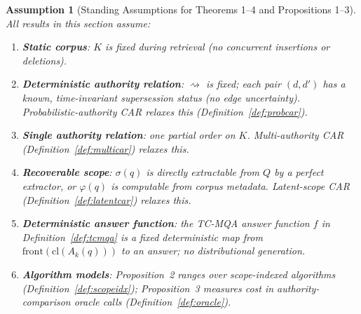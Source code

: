 \documentclass[11pt]{article}
\newtheorem{assumption}{Assumption}
\begin{document}
\begin{table}[h]
\centering\small
{}
\end{table}

\begin{assumption}[Standing Assumptions for Theorems 1--4 and Propositions 1--3]
\label{ass:standing}
All results in this section assume:
\begin{enumerate}[noitemsep,label=(\roman*)]
  \item \textbf{Static corpus}: $K$ is fixed during retrieval (no concurrent insertions or deletions).
  \item \textbf{Deterministic authority relation}: $\rightsquigarrow$ is fixed; each pair $(d,d')$ has a known, time-invariant supersession status (no edge uncertainty). Probabilistic-authority CAR relaxes this (Definition~\ref{def:probcar}).
  \item \textbf{Single authority relation}: one partial order on $K$. Multi-authority CAR (Definition~\ref{def:multicar}) relaxes this.
  \item \textbf{Recoverable scope}: $\sigma(q)$ is directly extractable from $Q$ by a perfect extractor, or $\varphi(q)$ is computable from corpus metadata. Latent-scope CAR (Definition~\ref{def:latentcar}) relaxes this.
  \item \textbf{Deterministic answer function}: the TC-MQA answer function $f$ in Definition~\ref{def:tcmqa} is a fixed deterministic map from $\mathrm{front}(\mathrm{cl}(A_k(q)))$ to an answer; no distributional generation.
  \item \textbf{Algorithm models}: Proposition~2 ranges over scope-indexed algorithms (Definition~\ref{def:scopeidx}); Proposition~3 measures cost in authority-comparison oracle calls (Definition~\ref{def:oracle}).
\end{enumerate}
\end{assumption}
\end{document}
